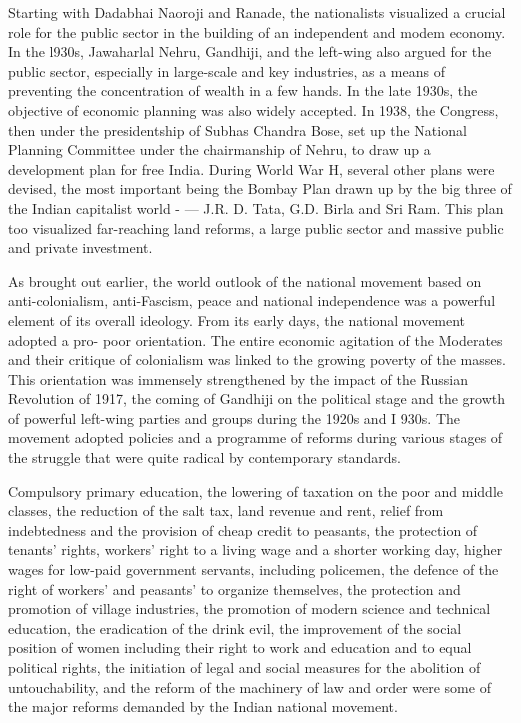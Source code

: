 \begin{multicols}{2}
Starting with Dadabhai Naoroji and Ranade, the nationalists visualized a crucial role for the public sector in the building of an independent and modem economy. In the l930s, Jawaharlal Nehru, Gandhiji, and the left-wing also argued for the public sector, especially in large-scale and key industries, as a means of preventing the concentration of wealth in a few hands. In the late 1930s, the objective of economic planning was also widely accepted. In 1938, the Congress, then under the presidentship of Subhas Chandra Bose, set up the National Planning Committee under the chairmanship of Nehru, to draw up a development plan for free India. During World War H, several other plans were devised, the most important being the Bombay Plan drawn up by the big three of the Indian capitalist world - --- J.R. D. Tata, G.D. Birla and Sri Ram. This plan too visualized far-reaching land reforms, a large public sector and massive public and private investment.

As brought out earlier, the world outlook of the national movement based on anti-colonialism, anti-Fascism, peace and national independence was a powerful element of its overall ideology. From its early days, the national movement adopted a pro- poor orientation. The entire economic agitation of the Moderates and their critique of colonialism was linked to the growing poverty of the masses. This orientation was immensely strengthened by the impact of the Russian Revolution of 1917, the coming of Gandhiji on the political stage and the growth of powerful left-wing parties and groups during the 1920s and I 930s. The movement adopted policies and a programme of reforms during various stages of the struggle that were quite radical by contemporary standards.

Compulsory primary education, the lowering of taxation on the poor and middle classes, the reduction of the salt tax, land revenue and rent, relief from indebtedness and the provision of cheap credit to peasants, the protection of tenants' rights, workers' right to a living wage and a shorter working day, higher wages for low-paid government servants, including policemen, the defence of the right of workers' and peasants' to organize themselves, the protection and promotion of village industries, the promotion of modern science and technical education, the eradication of the drink evil, the improvement of the social position of women including their right to work and education and to equal political rights, the initiation of legal and social measures for the abolition of untouchability, and the reform of the machinery of law and order were some of the major reforms demanded by the Indian national movement.


\end{multicols}
